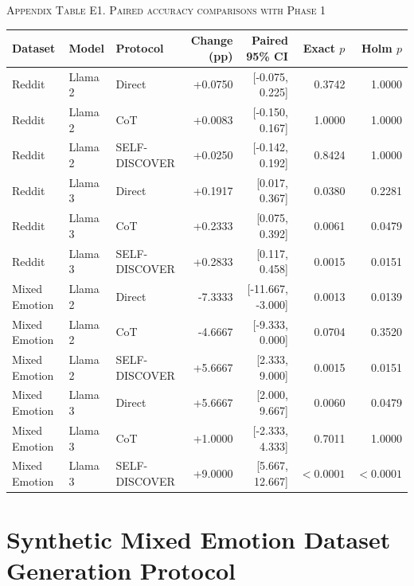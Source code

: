 \documentclass{ieeeaccess}
\begin{document}
\par\medskip\noindent\textsc{Appendix Table E1. Paired accuracy comparisons with Phase 1}\par\smallskip
{\small\renewcommand{\arraystretch}{1.18}\noindent\begin{tabular*}{\textwidth}{@{\extracolsep{\fill}}lllrrrr@{}}\toprule
Dataset & Model & Protocol & Change (pp) & Paired 95\% CI & Exact $p$ & Holm $p$ \\\midrule
Reddit & Llama 2 & Direct & +0.0750 & [-0.075, 0.225] & 0.3742 & 1.0000 \\
Reddit & Llama 2 & CoT & +0.0083 & [-0.150, 0.167] & 1.0000 & 1.0000 \\
Reddit & Llama 2 & SELF-DISCOVER & +0.0250 & [-0.142, 0.192] & 0.8424 & 1.0000 \\
Reddit & Llama 3 & Direct & +0.1917 & [0.017, 0.367] & 0.0380 & 0.2281 \\
Reddit & Llama 3 & CoT & +0.2333 & [0.075, 0.392] & 0.0061 & 0.0479 \\
Reddit & Llama 3 & SELF-DISCOVER & +0.2833 & [0.117, 0.458] & 0.0015 & 0.0151 \\
Mixed Emotion & Llama 2 & Direct & -7.3333 & [-11.667, -3.000] & 0.0013 & 0.0139 \\
Mixed Emotion & Llama 2 & CoT & -4.6667 & [-9.333, 0.000] & 0.0704 & 0.3520 \\
Mixed Emotion & Llama 2 & SELF-DISCOVER & +5.6667 & [2.333, 9.000] & 0.0015 & 0.0151 \\
Mixed Emotion & Llama 3 & Direct & +5.6667 & [2.000, 9.667] & 0.0060 & 0.0479 \\
Mixed Emotion & Llama 3 & CoT & +1.0000 & [-2.333, 4.333] & 0.7011 & 1.0000 \\
Mixed Emotion & Llama 3 & SELF-DISCOVER & +9.0000 & [5.667, 12.667] & $<0.0001$ & $<0.0001$ \\
\bottomrule\end{tabular*}}\par\medskip

\clearpage
\section{Synthetic Mixed Emotion Dataset Generation Protocol}
\end{document}
